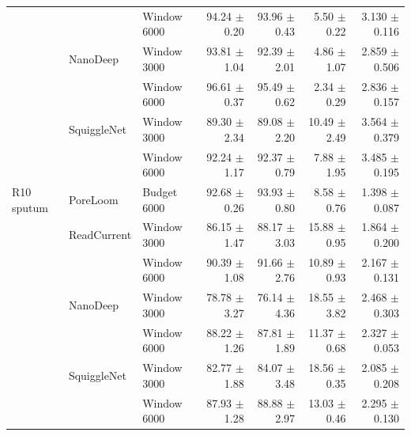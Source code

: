 \begin{tabular}{@{}lllrrrr@{}}
 &  & Window 6000 & 94.24 $\pm$ 0.20 & 93.96 $\pm$ 0.43 & 5.50 $\pm$ 0.22 & 3.130 $\pm$ 0.116\\
 & NanoDeep & Window 3000 & 93.81 $\pm$ 1.04 & 92.39 $\pm$ 2.01 & 4.86 $\pm$ 1.07 & 2.859 $\pm$ 0.506\\
 &  & Window 6000 & 96.61 $\pm$ 0.37 & 95.49 $\pm$ 0.62 & 2.34 $\pm$ 0.29 & 2.836 $\pm$ 0.157\\
 & SquiggleNet & Window 3000 & 89.30 $\pm$ 2.34 & 89.08 $\pm$ 2.20 & 10.49 $\pm$ 2.49 & 3.564 $\pm$ 0.379\\
 &  & Window 6000 & 92.24 $\pm$ 1.17 & 92.37 $\pm$ 0.79 & 7.88 $\pm$ 1.95 & 3.485 $\pm$ 0.195\\
\addlinespace
R10 sputum & PoreLoom & Budget 6000 & 92.68 $\pm$ 0.26 & 93.93 $\pm$ 0.80 & 8.58 $\pm$ 0.76 & 1.398 $\pm$ 0.087\\
 & ReadCurrent & Window 3000 & 86.15 $\pm$ 1.47 & 88.17 $\pm$ 3.03 & 15.88 $\pm$ 0.95 & 1.864 $\pm$ 0.200\\
 &  & Window 6000 & 90.39 $\pm$ 1.08 & 91.66 $\pm$ 2.76 & 10.89 $\pm$ 0.93 & 2.167 $\pm$ 0.131\\
 & NanoDeep & Window 3000 & 78.78 $\pm$ 3.27 & 76.14 $\pm$ 4.36 & 18.55 $\pm$ 3.82 & 2.468 $\pm$ 0.303\\
 &  & Window 6000 & 88.22 $\pm$ 1.26 & 87.81 $\pm$ 1.89 & 11.37 $\pm$ 0.68 & 2.327 $\pm$ 0.053\\
 & SquiggleNet & Window 3000 & 82.77 $\pm$ 1.88 & 84.07 $\pm$ 3.48 & 18.56 $\pm$ 0.35 & 2.085 $\pm$ 0.208\\
 &  & Window 6000 & 87.93 $\pm$ 1.28 & 88.88 $\pm$ 2.97 & 13.03 $\pm$ 0.46 & 2.295 $\pm$ 0.130\\
\bottomrule\end{tabular}
\endgroup
